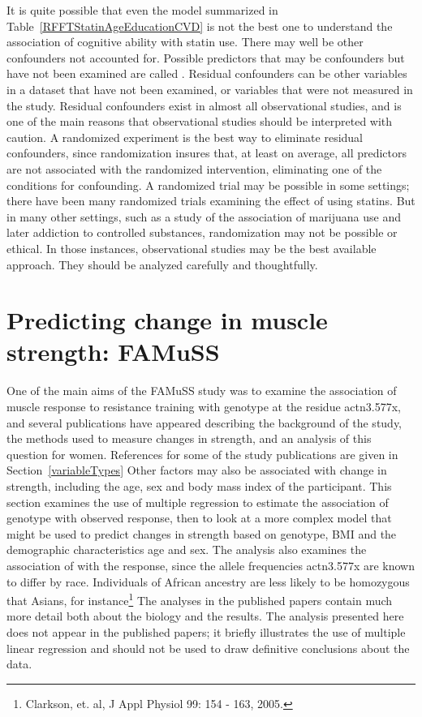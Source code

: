 It is quite possible that even the model summarized in
Table~\ref{RFFTStatinAgeEducationCVD} is not the best one to understand
the association of cognitive ability with statin use.  There may well be
other confounders not accounted for.  Possible predictors that may be
confounders but have not been examined are called .  Residual confounders can be other variables in a dataset
that have not been examined, or variables that were not measured in the
study.  Residual confounders exist in almost all observational studies,
and is one of the main reasons that observational studies should be
interpreted with caution.  A randomized experiment is the best way to
eliminate residual confounders, since randomization insures that, at
least on average, all predictors are not associated with the randomized
intervention, eliminating one of the conditions for confounding.  A
randomized trial may be possible in some settings; there have been many
randomized trials examining the effect of using statins. But in many
other settings, such as a study of the association of marijuana use and
later addiction to controlled substances, randomization may not be
possible or ethical.  In those instances, observational studies may be
the best available approach. They should be analyzed carefully and
thoughtfully.


\section{Predicting change in muscle strength: FAMuSS}

One of the main aims of the FAMuSS study was to examine the association of muscle response to resistance training with genotype at the residue actn3.577x, and several publications have appeared describing the background of the study, the methods used to measure changes in strength, and an analysis of this question for women.  References for some of the study publications are given in Section~\ref{variableTypes}  Other factors may also be associated with change in strength, including the age, sex and body mass index of the participant.  This section examines the use of multiple regression to estimate the association of genotype with observed response, then to look at a more complex model that might be used to predict changes in strength based on genotype, BMI and the demographic characteristics age and sex.  The analysis also examines the association of  with the response,  since the allele frequencies actn3.577x are known to differ by race.  Individuals of African ancestry are less likely to be homozygous that Asians, for instance\footnote{Clarkson, et. al, J Appl Physiol 99: 154 - 163, 2005.}  The analyses in the published papers contain much more detail both about the biology and the results.  The analysis presented here does not appear in the published papers; it briefly illustrates the use of multiple linear regression and should not be used to draw definitive conclusions about the data.

